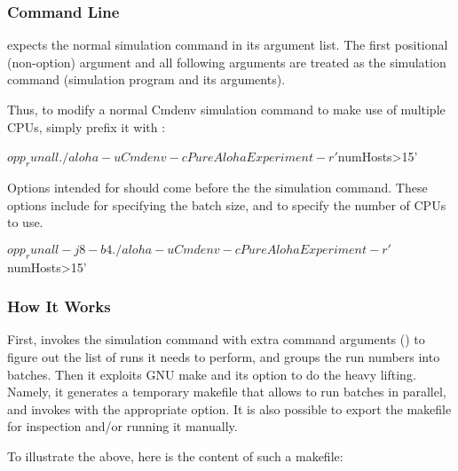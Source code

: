 \subsubsection{Command Line}
\label{sec:run-sim:opp-runall:comandline}

 expects the normal simulation command in its argument list.
The first positional (non-option) argument and all following arguments are
treated as the simulation command (simulation program and its arguments).

Thus, to modify a normal Cmdenv simulation command to make use of multiple
CPUs, simply prefix it with :    

\begin{commandline}
$ opp_runall ./aloha -u Cmdenv -c PureAlohaExperiment -r '$numHosts>15'
\end{commandline}

Options intended for  should come before the the simulation
command. These options include  for specifying the batch size, and 
 to specify the number of CPUs to use.

\begin{commandline}
$ opp_runall -j8 -b4 ./aloha -u Cmdenv -c PureAlohaExperiment -r '$numHosts>15'
\end{commandline}


\subsubsection{How It Works}
\label{sec:run-sim:opp-runall:operation}

First,  invokes the simulation command with extra command
arguments () to figure out the list of runs it needs to
perform, and groups the run numbers into batches. Then it exploits GNU make and
its  option to do the heavy lifting. Namely, it generates a
temporary makefile that allows  to run batches in parallel, and
invokes  with the appropriate  option. It is also possible
to export the makefile for inspection and/or running it manually.

To illustrate the above, here is the content of such a makefile:



